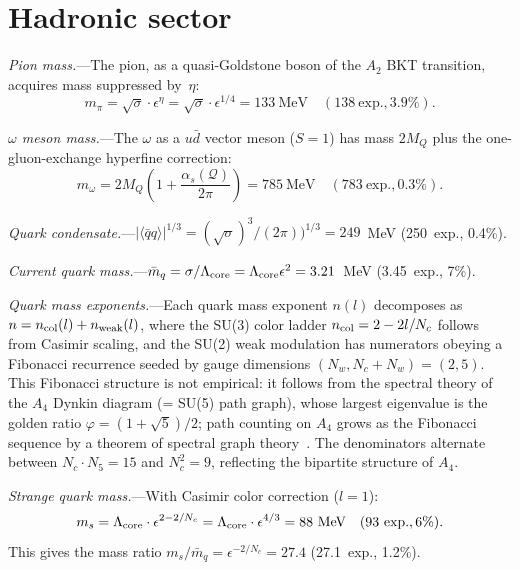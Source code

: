﻿\documentclass[aps,prl,twocolumn,superscriptaddress,showpacs]{revtex4-2}
\newcommand{\Qoppa}{\mathcal{Q}} %
\begin{document}
\section{Hadronic sector}

\textit{Pion mass.}---The pion, as a quasi-Goldstone boson of the
$A_2$ BKT transition, acquires mass suppressed by~$\eta$:
\begin{equation}\label{eq:mpi}
m_\pi = \sqrt{\sigma}\cdot\epsilon^{\eta} = \sqrt{\sigma}\cdot\epsilon^{1/4}
= 133~\text{MeV}\quad (138~\text{exp.}, 3.9\%).
\end{equation}

\textit{$\omega$ meson mass.}---The $\omega$ as a $u\bar{d}$ vector
meson ($S=1$) has mass $2M_Q$ plus the one-gluon-exchange hyperfine
correction:
\begin{equation}\label{eq:momega}
m_\omega = 2M_Q\!\left(1 + \frac{\alpha_s(\Qoppa)}{2\pi}\right)
= 785~\text{MeV}\quad (783~\text{exp.}, 0.3\%).
\end{equation}

\textit{Quark condensate.}---$|\langle\bar{q}q\rangle|^{1/3}
= (\sqrt{\sigma})^3/(2\pi))^{1/3} = 249$~MeV (250~exp., 0.4\%).

\textit{Current quark mass.}---$\bar{m}_q = \sigma/\Lambda_{\rm core}
= \Lambda_{\rm core}\epsilon^2 = 3.21$~MeV (3.45~exp., 7\%).

\textit{Quark mass exponents.}---Each quark mass exponent $n(l)$
decomposes as $n = n_{\rm col}(l) + n_{\rm weak}(l)$, where the SU(3)
color ladder $n_{\rm col} = 2 - 2l/N_c$ follows from Casimir scaling,
and the SU(2) weak modulation has numerators obeying a Fibonacci
recurrence seeded by gauge dimensions $(N_w, N_c + N_w) = (2, 5)$.
This Fibonacci structure is not empirical: it follows from the spectral
theory of the $A_4$ Dynkin diagram (= SU(5) path graph), whose largest
eigenvalue is the golden ratio $\varphi = (1+\sqrt{5})/2$; path
counting on $A_4$ grows as the Fibonacci sequence by a theorem of
spectral graph theory~\cite{PaperVII}. The denominators alternate
between $N_c \cdot N_5 = 15$ and $N_c^2 = 9$, reflecting the bipartite
structure of $A_4$.

\textit{Strange quark mass.}---With Casimir color correction ($l=1$):
\begin{equation}\label{eq:ms}
m_s = \Lambda_{\rm core}\cdot\epsilon^{2-2/N_c} = \Lambda_{\rm core}\cdot\epsilon^{4/3}
= 88~\text{MeV}\quad (93~\text{exp.}, 6\%).
\end{equation}
This gives the mass ratio $m_s/\bar{m}_q = \epsilon^{-2/N_c} = 27.4$
(27.1~exp., 1.2\%).
\end{document}

